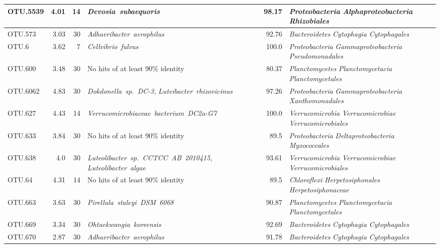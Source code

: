 \begin{ThreePartTable}
\begin{longtable}{lrrP{5cm}rP{5cm}}
OTU.5539 & 4.01 & 14 & \mbox{\textit{Devosia subaequoris}} & 98.17 & \mbox{\textit{Proteobacteria}} \mbox{\textit{Alphaproteobacteria}} \mbox{\textit{Rhizobiales}} \\ \midrule
OTU.573 & 3.03 & 30 & \mbox{\textit{Adhaeribacter aerophilus}} & 92.76 & \mbox{\textit{Bacteroidetes}} \mbox{\textit{Cytophagia}} \mbox{\textit{Cytophagales}} \\ \midrule
OTU.6 & 3.62 & 7 & \mbox{\textit{Cellvibrio fulvus}} & 100.0 & \mbox{\textit{Proteobacteria}} \mbox{\textit{Gammaproteobacteria}} \mbox{\textit{Pseudomonadales}} \\ \midrule
OTU.600 & 3.48 & 30 & {No hits of at least 90\% identity} & 80.37 & \mbox{\textit{Planctomycetes}} \mbox{\textit{Planctomycetacia}} \mbox{\textit{Planctomycetales}} \\ \midrule
OTU.6062 & 4.83 & 30 & \mbox{\textit{Dokdonella sp. DC-3}}, \mbox{\textit{Luteibacter rhizovicinus}} & 97.26 & \mbox{\textit{Proteobacteria}} \mbox{\textit{Gammaproteobacteria}} \mbox{\textit{Xanthomonadales}} \\ \midrule
OTU.627 & 4.43 & 14 & \mbox{\textit{Verrucomicrobiaceae bacterium DC2a-G7}} & 100.0 & \mbox{\textit{Verrucomicrobia}} \mbox{\textit{Verrucomicrobiae}} \mbox{\textit{Verrucomicrobiales}} \\ \midrule
OTU.633 & 3.84 & 30 & {No hits of at least 90\% identity} & 89.5 & \mbox{\textit{Proteobacteria}} \mbox{\textit{Deltaproteobacteria}} \mbox{\textit{Myxococcales}} \\ \midrule
OTU.638 & 4.0 & 30 & \mbox{\textit{Luteolibacter sp. CCTCC AB 2010415}}, \mbox{\textit{Luteolibacter algae}} & 93.61 & \mbox{\textit{Verrucomicrobia}} \mbox{\textit{Verrucomicrobiae}} \mbox{\textit{Verrucomicrobiales}} \\ \midrule
OTU.64 & 4.31 & 14 & {No hits of at least 90\% identity} & 89.5 & \mbox{\textit{Chloroflexi}} \mbox{\textit{Herpetosiphonales}} \mbox{\textit{Herpetosiphonaceae}} \\ \midrule
OTU.663 & 3.63 & 30 & \mbox{\textit{Pirellula staleyi DSM 6068}} & 90.87 & \mbox{\textit{Planctomycetes}} \mbox{\textit{Planctomycetacia}} \mbox{\textit{Planctomycetales}} \\ \midrule
OTU.669 & 3.34 & 30 & \mbox{\textit{Ohtaekwangia koreensis}} & 92.69 & \mbox{\textit{Bacteroidetes}} \mbox{\textit{Cytophagia}} \mbox{\textit{Cytophagales}} \\ \midrule
OTU.670 & 2.87 & 30 & \mbox{\textit{Adhaeribacter aerophilus}} & 91.78 & \mbox{\textit{Bacteroidetes}} \mbox{\textit{Cytophagia}} \mbox{\textit{Cytophagales}} \\ \midrule

\end{longtable}
\end{ThreePartTable}
